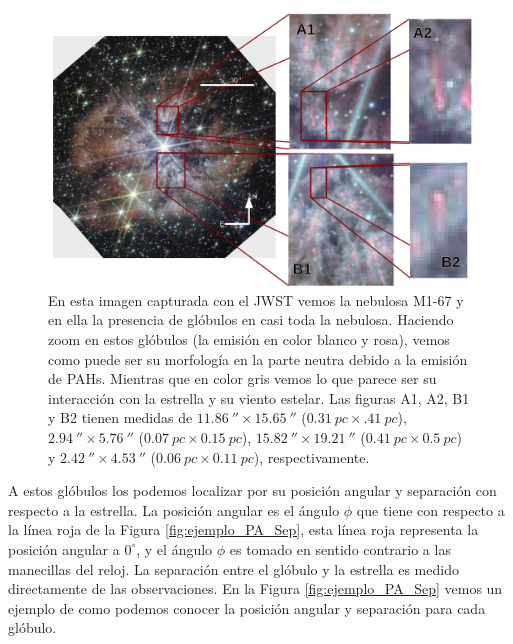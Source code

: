 \documentclass{book}
\begin{document}
\begin{figure}[htb]
    \centering
    \includegraphics[width=\textwidth]{ultimas correcciones/WR124_glo_ej.pdf}
    \caption{En esta imagen capturada con el JWST vemos la nebulosa
      M1-67 y en ella la presencia de glóbulos en casi toda la
      nebulosa. Haciendo zoom en estos glóbulos (la emisión en color
      blanco y rosa), vemos como puede ser su morfología en la parte
      neutra debido a la emisión de PAHs. Mientras que en color gris
      vemos lo que parece ser su interacción con la estrella y su
      viento estelar. Las figuras A1, A2, B1 y B2 tienen medidas de
      $\SI{11.86}{\arcsecond}\times\SI{15.65}{\arcsecond}$
      ($\SI{0.31}{pc}\times\SI{.41}{pc}$),
      $\SI{2.94}{\arcsecond}\times\SI{5.76}{\arcsecond}$
      ($\SI{0.07}{pc}\times\SI{0.15}{pc}$),
      $\SI{15.82}{\arcsecond}\times\SI{19.21}{\arcsecond}$
      ($\SI{0.41}{pc}\times\SI{0.5}{pc}$) y
      $\SI{2.42}{\arcsecond}\times\SI{4.53}{\arcsecond}$
      ($\SI{0.06}{pc}\times\SI{0.11}{pc}$), respectivamente.}
    \label{fig:nudos WR124}
\end{figure}

A estos glóbulos los podemos localizar por su posición angular y
separación con respecto a la estrella. La posición angular es el
ángulo $\phi$ que tiene con respecto a la línea roja de la Figura
\ref{fig:ejemplo_PA_Sep}, esta línea roja representa la posición
angular a $0^\circ$, y el ángulo $\phi$ es tomado en sentido contrario a las
manecillas del reloj. La separación entre el glóbulo y la estrella es
medido directamente de las observaciones. En la Figura
\ref{fig:ejemplo_PA_Sep} vemos un ejemplo de como podemos conocer la
posición angular y separación para cada glóbulo.
\end{document}
